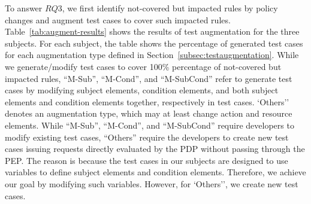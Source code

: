 To answer $RQ3$, we first identify
not-covered but impacted rules by policy changes
and augment test cases to cover such impacted rules.
Table~\ref{tab:augment-results} shows the results of test augmentation for the three subjects.
For each subject, the table shows the percentage of
generated test cases for each augmentation type defined in Section~\ref{subsec:testaugmentation}.
While we generate/modify test cases to cover 100\% percentage of not-covered but impacted rules,
``M-Sub'', ``M-Cond'', and ``M-SubCond'' refer to generate test cases by modifying
subject elements, condition elements, and both subject elements and condition elements together, respectively in test cases.
`Others'' denotes an augmentation type, which
may at least change action and resource elements.
While ``M-Sub'', ``M-Cond'', and ``M-SubCond'' require developers to modify existing
test cases, ``Others'' require the developers to create new test cases issuing requests
directly evaluated by the PDP without passing through the PEP. The reason is because the test cases in our subjects are
designed to use variables to define subject elements and condition elements. Therefore,
we achieve our goal by modifying such variables. However, for `Others'', we create
new test cases.


